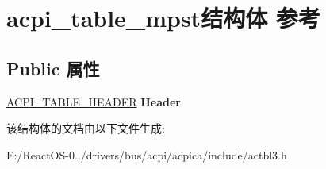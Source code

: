\hypertarget{structacpi__table__mpst}{}\section{acpi\+\_\+table\+\_\+mpst结构体 参考}
\label{structacpi__table__mpst}
\subsection*{Public 属性}
\begin{DoxyCompactItemize}
\item 
\mbox{\label{structacpi__table__mpst_a1036ac9180d67dc05ae2e08fff787734}} 
\hyperlink{structacpi__table__header}{A\+C\+P\+I\+\_\+\+T\+A\+B\+L\+E\+\_\+\+H\+E\+A\+D\+ER} {\bfseries Header}
\end{DoxyCompactItemize}


该结构体的文档由以下文件生成\+:\begin{DoxyCompactItemize}
\item 
E\+:/\+React\+O\+S-\/0../drivers/bus/acpi/acpica/include/actbl3.\+h\end{DoxyCompactItemize}
